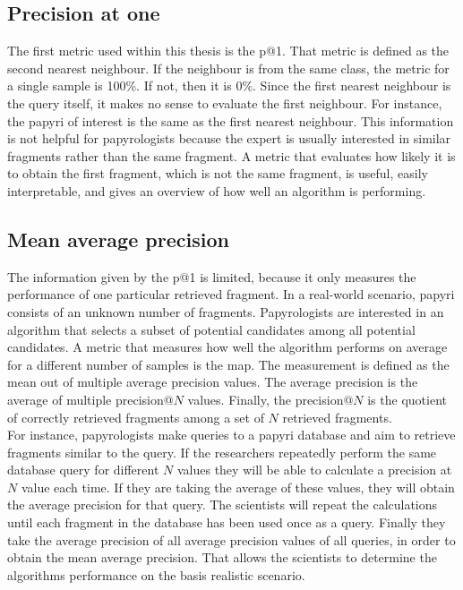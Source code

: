 \subsection{Precision at one}
\label{sec:precision}
The first metric used within this thesis is the \ac{p@1}. That metric is defined as the second nearest neighbour. If the neighbour is from the same class, the metric for a single sample is 100\%. If not, then it is 0\%. Since the first nearest neighbour is the query itself, it makes no sense to evaluate the first neighbour. For instance, the papyri of interest is the same as the first nearest neighbour. This information is not helpful for papyrologists because the expert is usually interested in similar fragments rather than the same fragment. A metric that evaluates how likely it is to obtain the first fragment, which is not the same fragment, is useful, easily interpretable, and gives an overview of how well an algorithm is performing.
%
\subsection{Mean average precision}
The information given by the \ac{p@1} is limited, because it only measures the performance of one particular retrieved fragment. In a real-world scenario, papyri consists of an unknown number of fragments. Papyrologists are interested in an algorithm that selects a subset of potential candidates among all potential candidates. A metric that measures how well the algorithm performs on average for a different  number of samples is the \ac{map}. The measurement is defined as the mean out of multiple average precision values. The average precision is the average of multiple precision@\(N\) values. Finally, the precision@\(N\) is the quotient of correctly retrieved fragments among a set of \(N\) retrieved fragments.\\ 

\noindent For instance, papyrologists make queries to a papyri database and aim to retrieve fragments similar to the query. If the researchers repeatedly perform the same database query for different \(N\) values they will be able to calculate a precision at \(N\) value each time. If they are taking the average of these values, they will obtain the average precision for that query. The scientists will repeat the calculations until each fragment in the database has been used once as a query. Finally they take the average precision of all average precision values of all queries, in order to obtain the mean average precision. That allows the scientists to determine the algorithms performance on the basis realistic scenario. 